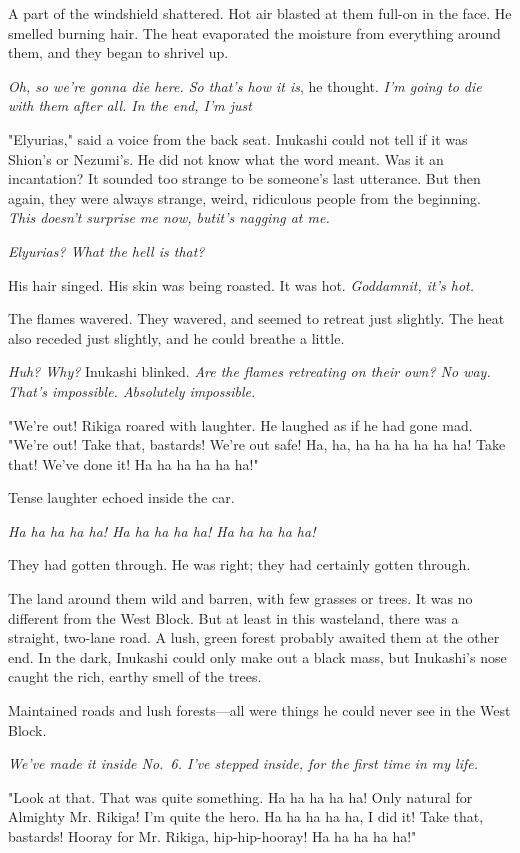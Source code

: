 A part of the windshield shattered. Hot air blasted at them full-on in
the face. He smelled burning hair. The heat evaporated the moisture from
everything around them, and they began to shrivel up.

\emph{Oh, so we're gonna die here. So that's how it is}, he thought. \emph{I'm going
to die with them after all. In the end, I'm just\el }

"Elyurias," said a voice from the back seat. Inukashi could not tell if
it was Shion's or Nezumi's. He did not know what the word meant. Was it
an incantation? It sounded too strange to be someone's last utterance.
But then again, they were always strange, weird, ridiculous people from
the beginning. \emph{This doesn't surprise me now, but\el it's nagging at me.}

\emph{Elyurias? What the hell is that?}

His hair singed. His skin was being roasted. It was hot. \emph{Goddamnit, it's
hot.}

The flames wavered. They wavered, and seemed to retreat just slightly.
The heat also receded just slightly, and he could breathe a little.

\emph{Huh? Why?} Inukashi blinked. \emph{Are the flames retreating on their own? No
way. That's impossible. Absolutely impossible.}

"We're out! Rikiga roared with laughter. He laughed as if he had gone
mad. "We're out! Take that, bastards! We're out safe! Ha, ha, ha ha ha
ha ha ha! Take that! We've done it! Ha ha ha ha ha ha!"

Tense laughter echoed inside the car.

\emph{Ha ha ha ha ha! Ha ha ha ha ha! Ha ha ha ha ha!}

They had gotten through. He was right; they had certainly gotten
through.

The land around them wild and barren, with few grasses or trees. It was
no different from the West Block. But at least in this wasteland, there
was a straight, two-lane road. A lush, green forest probably awaited
them at the other end. In the dark, Inukashi could only make out a black
mass, but Inukashi's nose caught the rich, earthy smell of the trees.

Maintained roads and lush forests---all were things he could never see in
the West Block.

\emph{We've made it inside No.~6. I've stepped inside, for the first time in
my life.}

"Look at that. That was quite something. Ha ha ha ha ha! Only natural
for Almighty Mr. Rikiga! I'm quite the hero. Ha ha ha ha ha, I did it!
Take that, bastards! Hooray for Mr. Rikiga, hip-hip-hooray! Ha ha ha ha
ha!"

